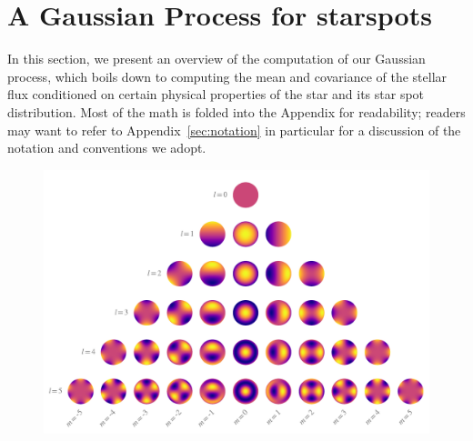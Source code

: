 \documentclass[modern]{aastex62}
\begin{document}
\section{A Gaussian Process for starspots}
\label{sec:main}

In this section, we present an overview of the computation of our Gaussian
process, which boils down to computing the mean and covariance of the stellar
flux conditioned on certain physical properties of the star and its star spot
distribution. Most of the math is folded into the Appendix for readability;
readers may want to refer to Appendix~\ref{sec:notation} in particular for
a discussion of the notation and conventions we adopt.

\begin{figure}[t!]
    \begin{centering}
        \includegraphics[width=\linewidth]{figures/ylms.pdf}
    \end{centering}
\end{figure}
\end{document}
